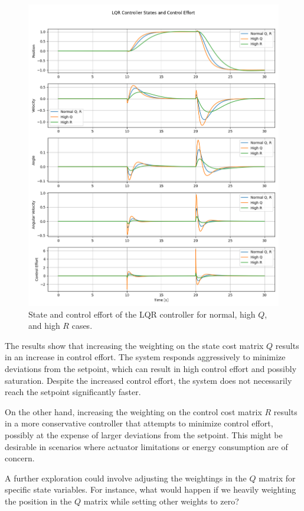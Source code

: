 \documentclass[11pt,twocolumn,twoside,lineno]{pnas-new}
\begin{document}
\begin{figure}[h]
\centering
\includegraphics[width=\linewidth]{simulations/lqr_controller.png}
\caption{State and control effort of the LQR controller for normal, high $Q$, and high $R$ cases.}
\end{figure}

The results show that increasing the weighting on the state cost matrix $Q$ results in an increase in control effort. The system responds aggressively to minimize deviations from the setpoint, which can result in high control effort and possibly saturation. Despite the increased control effort, the system does not necessarily reach the setpoint significantly faster.

On the other hand, increasing the weighting on the control cost matrix $R$ results in a more conservative controller that attempts to minimize control effort, possibly at the expense of larger deviations from the setpoint. This might be desirable in scenarios where actuator limitations or energy consumption are of concern.

A further exploration could involve adjusting the weightings in the $Q$ matrix for specific state variables. For instance, what would happen if we heavily weighting the position in the $Q$ matrix while setting other weights to zero?
\end{document}
